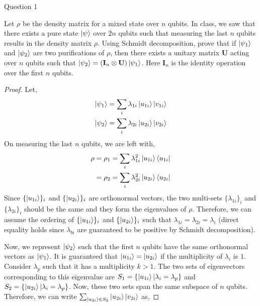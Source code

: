 \begin{solution}{Question 1}\label{ques:1}
    \begin{question}
        Let $\rho$ be the density matrix for a mixed state over $n$ qubits. In class, we saw that there exists a pure state $\ket{\psi}$ over $2n$ qubits such that measuring the last $n$ qubits results in the density matrix $\rho$. Using Schmidt decomposition, prove that if $\ket{\psi_1}$ and $\ket{\psi_2}$ are two purifications of $\rho$, then there exists a unitary matrix $\mathbf{U}$ acting over $n$ qubits such that $\ket{\psi_2} = (\mathbf{I}_n \otimes \mathbf{U}) \ket{\psi_1}$. Here $\mathbf{I}_n$ is the identity operation over the first $n$ qubits.
    \end{question}
    \tcblower{}
    \begin{proof}
        Let,
        \begin{equation}
            \begin{split}
                \ket{\psi_1} &= \sum_i\lambda_{1i}\ket{u_{1i}}\ket{v_{1i}}\\
                \ket{\psi_2} &= \sum_i\lambda_{2i}\ket{u_{2i}}\ket{v_{2i}}
            \end{split}
        \end{equation}
        On measuring the last $n$ qubits, we are left with,
        \begin{equation}
            \begin{split}
                \rho = \rho_1 &= \sum_i\lambda_{1i}^2\ket{u_{1i}}\bra{u_{1i}}\\
                =\rho_2 &= \sum_i\lambda_{2i}^2\ket{u_{2i}}\bra{u_{2i}}
            \end{split}
        \end{equation}
        Since $\{\ket{u_{1i}}\}_i$ and $\{\ket{u_{2i}}\}_i$ are orthonormal vectors, the two multi-sets $\{\lambda_{1i}\}_i$ and $\{\lambda_{2i}\}_i$ should be the same and they form the eigenvalues of $\rho$. Therefore, we can assume the ordering of $\{\ket{u_{1i}}\}_i$ and $\{\ket{u_{2i}}\}_i$ such that $\lambda_{1i} = \lambda_{2i} = \lambda_i$ (direct equality holds since $\lambda_{bi}$ are guaranteed to be positive by Schmidt decomposition).\par
        Now, we represent $\ket{\psi_2}$ such that the first $n$ qubits have the same orthonormal vectors as $\ket{\psi_1}$. It is guaranteed that $\ket{u_{1i}} = \ket{u_{2i}}$ if the multiplicity of $\lambda_i$ is $1$. Consider $\lambda_p$ such that it has a multiplicity $k > 1$. The two sets of eigenvectors corresponding to this eigenvalue are $S_1 = \{\ket{u_{1i}} | \lambda_i = \lambda_p\}$ and $S_2 = \{\ket{u_{2i}} | \lambda_i = \lambda_p\}$. Now, these two sets span the same subspace of $n$ qubits. Therefore, we can write $\sum_{\ket{u_{2i}}\in S_2}\ket{u_{2i}}\ket{v_{2i}}$ as,

\end{proof}
\end{solution}
